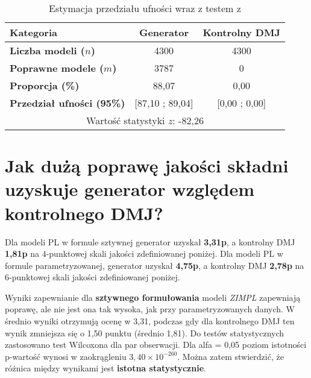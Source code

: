 \begin{table}[H]
\caption{Estymacja przedziału ufności wraz z testem z}\label{tab:experiment:analysis4}
\centering%
\begin{tabular}{|l|c|c|}
\hline
\textbf{Kategoria} & \textbf{Generator} & \textbf{Kontrolny DMJ} \\
\hline
\textbf{Liczba modeli ($n$)} & 4300 & 4300 \\
\hline
\textbf{Poprawne modele ($m$)} & 3787 & 0 \\
\hline
\textbf{Proporcja (\%)} & 88,07 & 0,00 \\
\hline
\textbf{Przedział ufności (95\%)} & [87,10 ; 89,04] & [0,00 ; 0,00] \\
\hline
\multicolumn{3}{|c|}{Wartość statystyki \( z \): -82,26} \\
\hline
\end{tabular}
\end{table}

\section{Jak dużą poprawę jakości składni uzyskuje generator względem kontrolnego DMJ?}

Dla modeli PL w formule sztywnej generator uzyskał \textbf{3,31p}, a kontrolny DMJ \textbf{1,81p} na 4-punktowej skali jakości zdefiniowanej poniżej. Dla modeli PL w formule parametryzowanej, generator uzyskał \textbf{4,75p}, a kontrolny DMJ \textbf{2,78p} na 6-punktowej skali jakości zdefiniowanej poniżej.

Wyniki zapewnianie dla \textbf{sztywnego formułowania} modeli  \textit{ZIMPL} zapewniają poprawę, ale nie jest ona tak wysoka, jak przy parametryzowanych danych. W średnio wyniki otrzymują ocenę w 3,31, podczas gdy dla kontrolnego DMJ ten wynik zmniejsza się o 1,50 punktu (średnio 1,81). Do testów statystycznych zastosowano test Wilcoxona dla par obserwacji. Dla alfa = 0,05 poziom istotności p-wartość wynosi w zaokrągleniu \textbf{\( 3{,}40 \times 10^{-260} \)}. Można zatem stwierdzić, że różnica między wynikami jest \textbf{istotna statystycznie}.

